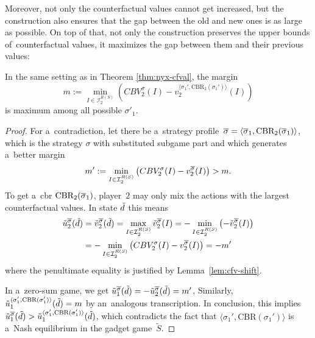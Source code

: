 \begin{cor}
  \label{cor:sm-max-margin-gadget}
  \todo
\end{cor}

\todo
Moreover, not only the counterfactual values cannot get increased, but the construction also ensures that the gap between the old and new ones is as large as possible.
On top of that, not only the construction preserves the upper bounds of~counterfactual values, it maximizes the gap between them and their previous values:

\begin{thm}
  \label{thm:sm-maximized}
  In the same setting as in Theorem \ref{thm:nyx-cfval}, the margin
  \[
    m := \min _{I \in \mathcal{I}_2^{R(S)}} 
    \left( CBV_2^\sigma(I) - v_2^{\langle\sigma_1', \textrm{CBR}_2 (\sigma_1')\rangle}(I) \right)
  \]
  is maximum among all possible $\sigma'_1$.
\end{thm}
\begin{proof}
  For a~contradiction, let there be a~strategy profile~${\overline{\sigma}} = \langle {\overline{\sigma}}_1, \textrm{CBR}_2 ({\overline{\sigma}}_1)\rangle$, which is the strategy $\sigma$ with substituted subgame part and which generates a~better margin
  \[
    m' := \min _{I \in \mathcal{I}_2^{R(S)}} 
    \left( CBV_2^\sigma(I) - v_2^{{\overline{\sigma}}}(I) \right)
    > m.
  \]
  To get a~\acrlong{cbr} $\textrm{CBR}_2 ({\overline{\sigma}}_1)$, player~$2$ may only mix the actions with the largest counterfactual values.
  In state $\tilde{d}$ this means
  \begin{equation*}
    \begin{split}
      \tilde{u}_2 ^{\overline{\sigma}}(\tilde{d})
      &= \tilde{v}_2 ^{\overline{\sigma}}(\tilde{d})
      = \max _{I \in \mathcal{I}_2^{R(S)}} \tilde{v}_2 ^{\overline{\sigma}}(I)
      = - \min _{I \in \mathcal{I}_2^{R(S)}} \left( -\tilde{v}_2 ^{\overline{\sigma}}(I) \right) \\
      &= - \min _{I \in \mathcal{I}_2^{R(S)}} \left( CBV_2^\sigma(I) - v_2^{{\overline{\sigma}}}(I) \right)
      = - m'
    \end{split}
  \end{equation*}
  where the penultimate equality is justified by Lemma~\ref{lem:cfv-shift}.

  In a~zero-sum game, we get
  $
  \tilde{u}_1 ^{\overline{\sigma}}(\tilde{d})
  = -\tilde{u}_2 ^{\overline{\sigma}}(\tilde{d})
  = m'
  $,
  Similarly,
  $
  \tilde{u}_1 ^{\langle\sigma_1', \textrm{CBR}(\sigma_1')\rangle} (\tilde{d})
  = m
  $
  by an~analogous transcription.
  In conclusion, this implies
  $
  \tilde{u}_1 ^{\overline{\sigma}}(\tilde{d})
  > \tilde{u}_1 ^{\langle\sigma_1', \textrm{CBR}(\sigma_1')\rangle} (\tilde{d})
  $,
  which contradicts the fact that $\langle\sigma_1', \textrm{CBR}(\sigma_1')\rangle$ is a~Nash equilibrium in the gadget game~$\tilde{S}$.
\end{proof}


